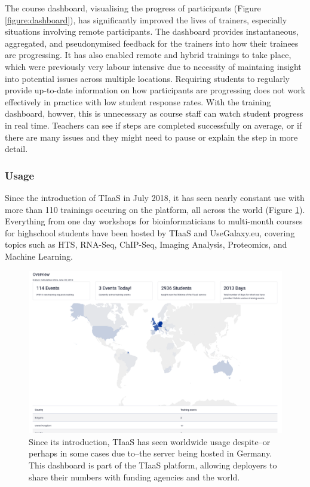 \documentclass[a4paper,num-refs]{oup-contemporary}
\begin{document}
The course dashboard, visualising the progress of participants (Figure \ref{figure:dashboard}), has significantly improved the lives of trainers, especially situations involving remote participants. The dashboard provides instantaneous, aggregated, and pseudonymised feedback for the trainers into how their trainees are progressing. It has also enabled remote and hybrid trainings to take place, which were previously very labour intensive due to necessity of maintaing insight into potential issues across multiple locations. Requiring students to regularly provide up-to-date information on how participants are progressing does not work effectively in practice with low student response rates. With the training dashboard, howver, this is unnecessary as course staff can watch student progress in real time. Teachers can see if steps are completed successfully on average, or if there are many issues and they might need to pause or explain the step in more detail.

\subsubsection{Usage}
Since the introduction of TIaaS in July 2018, it has seen nearly constant use with more than 110 trainings occuring on the platform, all across the world (Figure \ref{figure:map}). Everything from one day workshops for bioinformaticians to multi-month courses for highschool students have been hosted by TIaaS and UseGalaxy.eu, covering topics such as HTS, RNA-Seq, ChIP-Seq, Imaging Analysis, Proteomics, and Machine Learning.

\begin{figure}[bt!]
\centering
\includegraphics[width=\linewidth]{images/map.png}
	\caption{Since its introduction, TIaaS has seen worldwide usage despite--or perhaps in some cases due to--the server being hosted in Germany. This dashboard is part of the TIaaS platform, allowing deployers to share their numbers with funding agencies and the world.}\label{figure:map}
\end{figure}
\end{document}
